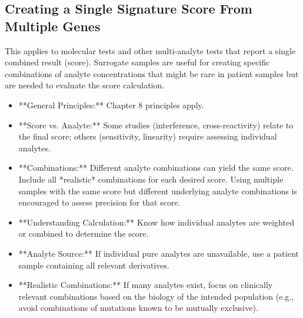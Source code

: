 \documentclass{article}
\begin{document}
\subsection{Creating a Single Signature Score From Multiple Genes}

This applies to molecular tests and other multi-analyte tests that report a single combined result (score). Surrogate samples are useful for creating specific combinations of analyte concentrations that might be rare in patient samples but are needed to evaluate the score calculation.

\begin{itemize}
    \item **General Principles:** Chapter 8 principles apply.
    \item **Score vs. Analyte:** Some studies (interference, cross-reactivity) relate to the final score; others (sensitivity, linearity) require assessing individual analytes.
    \item **Combinations:** Different analyte combinations can yield the same score. Include all *realistic* combinations for each desired score. Using multiple samples with the same score but different underlying analyte combinations is encouraged to assess precision for that score.
    \item **Understanding Calculation:** Know how individual analytes are weighted or combined to determine the score.
    \item **Analyte Source:** If individual pure analytes are unavailable, use a patient sample containing all relevant derivatives.
    \item **Realistic Combinations:** If many analytes exist, focus on clinically relevant combinations based on the biology of the intended population (e.g., avoid combinations of mutations known to be mutually exclusive).
\end{itemize}
\end{document}
